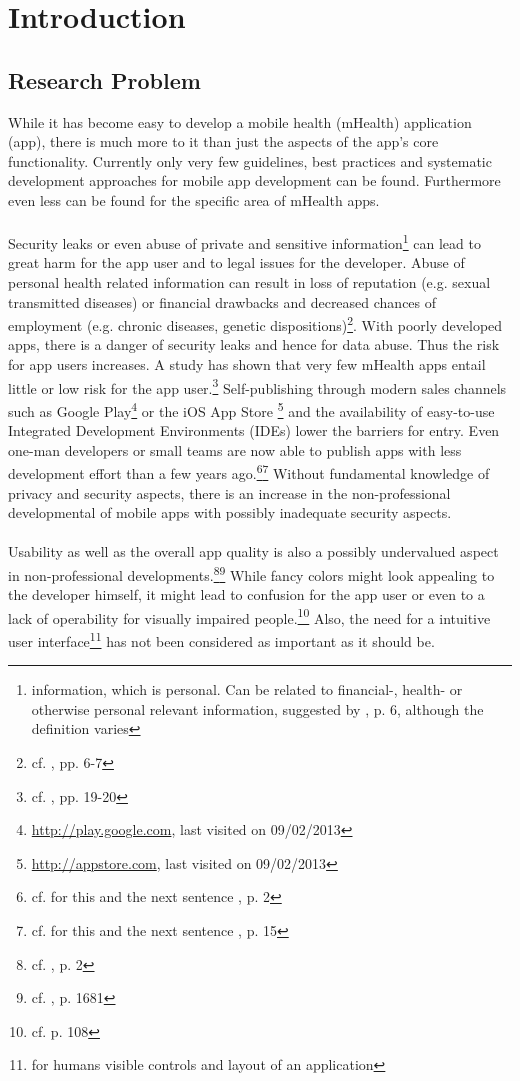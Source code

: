 \section{Introduction}
\subsection{Research Problem}
While it has become easy to develop a mobile health (mHealth) application (app), there is much more to it than just the aspects of the app's core functionality. Currently only very few guidelines, best practices and systematic development approaches for mobile app development can be found. Furthermore even less can be found for the specific area of mHealth apps.
\\
\\
Security leaks or even abuse of private and sensitive information\footnote{information, which is personal. Can be related to financial-, health- or otherwise personal relevant information, suggested by \cite{FutureofPrivacyForumCenterforDemocracy&Technology.2011}, p. 6, although the definition varies} can lead to great harm for the app user and to legal issues for the developer. Abuse of personal health related information can result in loss of reputation (e.g. sexual transmitted diseases) or financial drawbacks and decreased chances of employment (e.g. chronic diseases, genetic dispositions)\footnote{cf. \cite{Dehling.2013}, pp. 6-7}. With poorly developed apps, there is a danger of security leaks and hence for data abuse. Thus the risk for app users increases. A study has shown that very few mHealth apps entail little or low risk for the app user.\footnote{cf. \cite{Njie.2013}, pp. 19-20} Self-publishing through modern sales channels such as Google Play\footnote{\url{http://play.google.com}, last visited on 09/02/2013} or the iOS App Store \footnote{\url{http://appstore.com}, last visited on 09/02/2013} and the availability of easy-to-use Integrated Development Environments (IDEs) lower the barriers for entry. Even one-man developers or small teams are now able to publish apps with less development effort than a few years ago.\footnote{cf. for this and the next sentence \cite{Dehling.2013}, p. 2}\footnote{cf. for this and the next sentence \cite{Moore.2012}, p. 15} Without fundamental knowledge of privacy and security aspects, there is an increase in the non-professional developmental of mobile apps with possibly inadequate security aspects.
\\
\\
Usability as well as the overall app quality is also a possibly undervalued aspect in non-professional developments.\footnote{cf. \cite{Dehling.2013}, p. 2}\footnote{cf. \cite{Mayer.2012}, p. 1681} While fancy colors might look appealing to the developer himself, it might lead to confusion for the app user or even to a lack of operability for visually impaired people.\footnote{cf. \cite{Badashian.2008} p. 108} Also, the need for a intuitive user interface\footnote{for humans visible controls and layout of an application} has not been considered as important as it should be.
